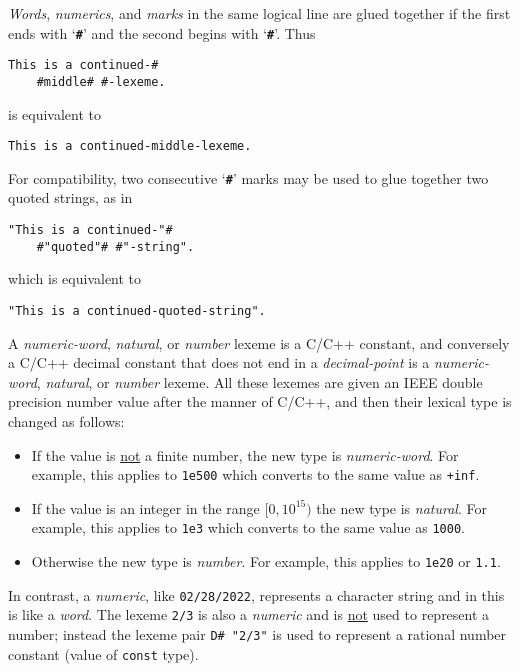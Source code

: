 \documentclass[12pt]{article}
\newcommand{\TT}[1]{{\tt \bfseries #1}}
\newenvironment{indpar}[1][0.3in]%
	{\begin{list}{}%
		     {\setlength{\itemsep}{0in}%
		      \setlength{\topsep}{0in}%
		      \setlength{\parsep}{1ex}%
		      \setlength{\labelwidth}{#1}%
		      \setlength{\leftmargin}{#1}%
		      \addtolength{\leftmargin}{\labelsep}}%
	 \item}%
	{\end{list}}
\begin{document}
{\em Words}, {\em numerics}, and {\em marks}
in the same logical line are glued together if the first
ends with `\TT{\#}' and the second begins with `\TT{\#}'.
Thus
\begin{indpar}\begin{verbatim}
This is a continued-#
    #middle# #-lexeme.
\end{verbatim}\end{indpar}
is equivalent to
\begin{indpar}\begin{verbatim}
This is a continued-middle-lexeme.
\end{verbatim}\end{indpar}
For compatibility, two consecutive `\TT{\#}' marks may be used
to glue together two quoted strings, as in
\begin{indpar}\begin{verbatim}
"This is a continued-"#
    #"quoted"# #"-string".
\end{verbatim}\end{indpar}
which is equivalent to
\begin{indpar}\begin{verbatim}
"This is a continued-quoted-string".
\end{verbatim}\end{indpar}


A {\em numeric-word}, {\em natural}, or {\em number} lexeme
is a C/C++ constant, and 
conversely a C/C++ decimal constant
that does not end in a {\em decimal-point}
is a {\em numeric-word}, {\em natural}, or {\em number} lexeme.
All these lexemes are given an IEEE double precision number value
after the manner of C/C++, and then their lexical type is changed
as follows:
\begin{itemize}\label{LEXEME-TYPE-CONVERSION}
\item If the value is \underline{not} a finite number, the
new type is {\em numeric-word}.  For example, this applies to {\tt 1e500}
which converts to the same value as {\tt +inf}.
\item If the value is an integer in the range $[0,10^{15})$ the new
type is {\em natural}.
For example, this applies to {\tt 1e3}
which converts to the same value as {\tt 1000}.
\item Otherwise the new type is {\em number}.
For example, this applies to {\tt 1e20} or {\tt 1.1}.
\end{itemize}

In contrast, a {\em numeric}, like {\tt 02/28/2022},
represents a character string and in this
is like a {\em word}.  The lexeme {\tt 2/3} is also a {\em numeric}
and is \underline{not} used to represent a number; instead
the lexeme pair {\tt D\# "2/3"} is used to represent a rational
number constant (value of {\tt const} type).
\end{document}
